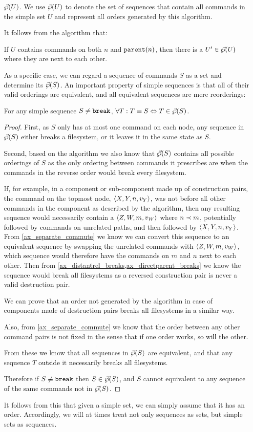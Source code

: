 \begin{mydef}{$\vec{\wp}({U})$.}
We use $\vec{\wp}({U})$ to denote the set of sequences that contain all commands in
the simple set $U$
and represent all orders generated by this algorithm.
\end{mydef}

It follows from the algorithm that:
\begin{mycor}\label{lemma:neighbor}
If $U$ contains commands on both $n$ and $\mathtt{parent}(n)$, then
there is a $U'\in\vec{\wp}({U})$ where they are next to each other.
\end{mycor}

As a specific case, we can regard a sequence of commands $S$
as a set and determine its $\vec{\wp}({S})$.
An important property of simple sequences is that
all of their valid orderings are equivalent,
and all equivalent sequences are mere reorderings:

\begin{mylem}\label{simple_reorder_equiv}
For any simple sequence $S\neq\mathtt{break}$,
$\forall T: T\equiv S \Leftrightarrow T\in\vec{\wp}({S})$.
\end{mylem}
\begin{proof}
First, as $S$ only has at most one command on each node,
any sequence in $\vec{\wp}({S})$ either breaks a filesystem,
or it leaves it in the same state as $S$.

Second, based on the algorithm we also know that $\vec{\wp}({S})$ contains
all possible orderings of $S$ as the only ordering between commands
it prescribes are when the commands in the reverse order would break every filesystem.

If, for example, in a component or sub-component
made up of construction pairs,
the command on the topmost node, $\langle{X,Y,n,v_Y}\rangle$, was not before all other commands
in the component as described by the algorithm,
then any resulting sequence would necessarily contain
a $\langle{Z,W,m,v_W}\rangle$ where $n\prec m$, potentially followed by commands
on unrelated paths, and then followed by $\langle{X,Y,n,v_Y}\rangle$.
From \cref{ax_separate_commute} we know we can convert this sequence
to an equivalent sequence by swapping the unrelated commands with
$\langle{Z,W,m,v_W}\rangle$, which sequence would therefore have the commands on
$m$ and $n$ next to each other. Then from \cref{ax_distantrel_breaks,ax_directparent_breaks}
we know the sequence would break all filesystems
as a reversed construction pair is never a valid destruction pair.

We can prove that an order not generated by the algorithm
in case of components made of destruction pairs breaks all filesystems
in a similar way.

Also, from \cref{ax_separate_commute} we know
that the order between any other command pairs is not fixed in the sense
that if one order works, so will the other.

From these we know that all sequences in $\vec{\wp}({S})$
are equivalent, and that any sequence $T$ outside it
necessarily breaks all filesystems.

Therefore if $S\not\equiv\mathtt{break}$ then $S\in\vec{\wp}({S})$,
and $S$ cannot equivalent to any sequence of the same commands
not in $\vec{\wp}({S})$.
\end{proof}

It follows from this that given a simple set,
we can simply assume that it has an order.
Accordingly, we will at times treat not only sequences as sets,
but simple sets as sequences.

